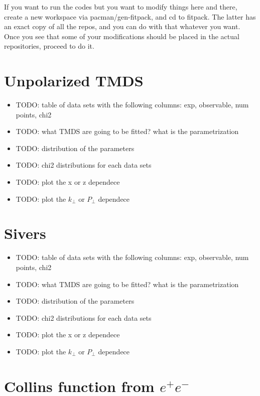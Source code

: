 \documentclass[floatfix,aps,prd,nofootinbib,superscriptaddress,preprint]{revtex4}
\newcommand\3[1]{\boldsymbol{#1}}
\begin{document}
If you want to run the codes but you want to modify things here and there, 
create a new workspace via pacman/gen-fitpack, and cd to fitpack. The latter 
has an exact copy of all the repos, and you can do with that whatever you want. 
Once you see that some of your modifications should be placed in the actual
repositories, proceed to do it.

\newpage
\section{Unpolarized TMDS}

\begin{itemize}
\item {\color{red} TODO: table of data sets with the following columns: exp, observable, num points, chi2 }
\item {\color{red} TODO: what TMDS are going to be fitted? what is the parametrization}
\item {\color{red} TODO: distribution of the parameters}
\item {\color{red} TODO: chi2 distributions for each data sets}
\item {\color{red} TODO: plot the x or z dependece}
\item {\color{red} TODO: plot the $k_{\perp}$ or $P_{\perp}$ dependece}
\end{itemize}

\newpage
\section{Sivers}

\begin{itemize}
\item {\color{red} TODO: table of data sets with the following columns: exp, observable, num points, chi2 }
\item {\color{red} TODO: what TMDS are going to be fitted? what is the parametrization}
\item {\color{red} TODO: distribution of the parameters}
\item {\color{red} TODO: chi2 distributions for each data sets}
\item {\color{red} TODO: plot the x or z dependece}
\item {\color{red} TODO: plot the $k_{\perp}$ or $P_{\perp}$ dependece}
\end{itemize}

\newpage
\section{Collins function from $e^+e^-$}
\end{document}
